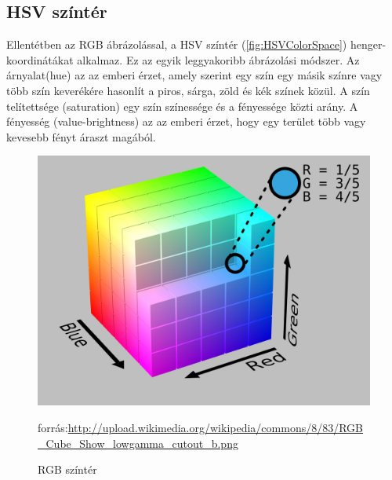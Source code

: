 \subsection{HSV színtér}\label{sec:PREPROC:hsv}

Ellentétben az RGB ábrázolással, a HSV színtér (\ref{fig:HSVColorSpace}) henger-koordinátákat alkalmaz. Ez az egyik leggyakoribb ábrázolási módszer. Az árnyalat(hue) az az emberi érzet, amely szerint egy szín egy másik színre vagy több szín keverékére hasonlít a piros, sárga, zöld és kék színek közül. A szín telítettsége (saturation) egy szín színessége és a fényessége közti arány. A fényesség (value-brightness) az az emberi érzet, hogy egy terület több vagy kevesebb fényt áraszt magából. 


\begin{figure}[h]
\centering

\includegraphics[scale=0.1]{RGBColorSpace}
\caption{RGB színtér}
\small forrás:\url{http://upload.wikimedia.org/wikipedia/commons/8/83/RGB_Cube_Show_lowgamma_cutout_b.png}
\label{fig:RGBColorSpace}
\end{figure}

